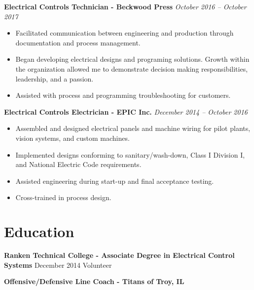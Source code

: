 \documentclass[letterpaper,10pt]{article} %
\newcommand{\job}[3]{
\textbf{#1 - #2} \hfill \textit{#3}
}
\newcommand{\education}[4]{
  \textbf{#1 - #2} \hfill #3
}
\begin{document}
\noindent\job{Electrical Controls Technician}{Beckwood Press}{October 2016 – October 2017}
\begin{itemize}[left=2em]
	\item Facilitated communication between engineering and production through documentation and process management.
	\item Began developing electrical designs and programing solutions. Growth within the organization allowed me to demonstrate
	decision making responsibilities, leadership, and a passion.
	\item Assisted with process and programming troubleshooting for customers.
\end{itemize}

\noindent\job{Electrical Controls Electrician}{EPIC Inc.}{December 2014 – October 2016}
\begin{itemize}[left=2em]
	\item Assembled and designed electrical panels and machine wiring for pilot plants, vision systems, and custom machines.
	\item Implemented designs conforming to sanitary/wash-down, Class I Division I, and National Electric Code requirements.
	\item Assisted engineering during start-up and final acceptance testing.
	\item Cross-trained in process design.
\end{itemize}

\section{Education}
\education{Ranken Technical College}{Associate Degree in Electrical Control Systems}{December 2014}

\section{Volunteer}
\job{Offensive/Defensive Line Coach}{Titans of Troy, IL}{}
\end{document}
